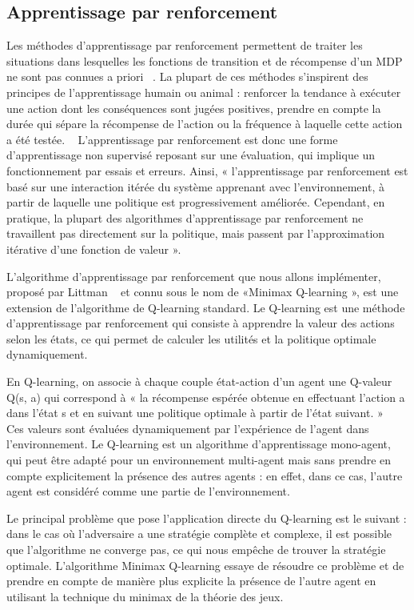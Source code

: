 \documentclass{article}
\begin{document}
\subsection{Apprentissage par renforcement}
Les méthodes d’apprentissage par renforcement permettent de traiter les situations dans lesquelles les fonctions de transition et de récompense d’un MDP ne sont pas connues a priori ~\cite{pdmia}. La plupart de ces méthodes s’inspirent des principes de l’apprentissage humain ou animal : renforcer la tendance à exécuter une action dont les conséquences sont jugées positives, prendre en compte la durée qui sépare la récompense de l’action ou la fréquence à laquelle cette action a été testée. ~\cite{pdmia} L’apprentissage par renforcement est donc une forme d’apprentissage non supervisé reposant sur une évaluation, qui implique un fonctionnement par essais et erreurs. Ainsi, « l’apprentissage par renforcement est basé sur une interaction itérée du système apprenant avec l’environnement, à partir de laquelle une politique est progressivement améliorée. Cependant, en pratique, la plupart des algorithmes d’apprentissage par renforcement ne travaillent pas directement sur la politique, mais passent par l’approximation itérative d’une fonction de valeur ». ~\cite{pdmia}

L’algorithme d’apprentissage par renforcement que nous allons implémenter, proposé par Littman ~\cite{littman} et connu sous le nom de «Minimax Q-learning », est une extension de l’algorithme de Q-learning standard. Le Q-learning est une méthode d’apprentissage par renforcement qui consiste à apprendre la valeur des actions selon les états, ce qui permet de calculer les utilités et la politique optimale dynamiquement.

En Q-learning, on associe à chaque couple état-action d’un agent une Q-valeur Q(s, a) qui correspond à « la récompense espérée obtenue en effectuant l’action a dans l’état s et en suivant une politique optimale à partir de l’état suivant. » ~\cite{gie-cha} Ces valeurs sont évaluées dynamiquement par l’expérience de l’agent dans l’environnement. Le Q-learning est un algorithme d’apprentissage mono-agent, qui peut être adapté pour un environnement multi-agent mais sans prendre en compte explicitement la présence des autres agents : en effet, dans ce cas, l’autre agent est considéré comme une partie de l’environnement.

Le principal problème que pose l’application directe du Q-learning est le suivant : dans le cas où l’adversaire a une stratégie complète et complexe, il est possible que l’algorithme ne converge pas, ce qui nous empêche de trouver la stratégie optimale. L’algorithme Minimax Q-learning essaye de résoudre ce problème et de prendre en compte de manière plus explicite la présence de l’autre agent en utilisant la technique du minimax de la théorie des jeux.
\end{document}
